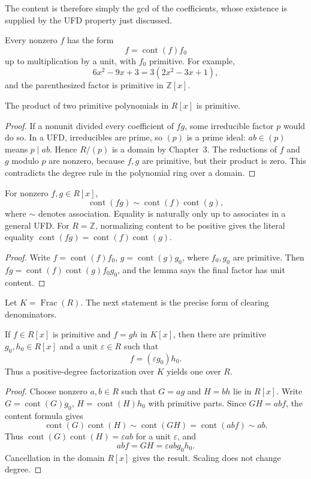 The content is therefore simply the gcd of the coefficients, whose existence
is supplied by the UFD property just discussed.

Every nonzero \(f\) has the form
\[f=\operatorname{cont}(f)f_0\]
up to multiplication by a unit, with \(f_0\) primitive.
For example,
\[6x^2-9x+3=3(2x^2-3x+1),\]
and the parenthesized factor is primitive in \(\mathbb Z[x]\).

\begin{lemma}
The product of two primitive polynomials in \(R[x]\) is primitive.
\end{lemma}
\begin{proof}
If a nonunit divided every coefficient of \(fg\), some irreducible factor
\(p\) would do so.  In a UFD, irreducibles are prime, so \((p)\) is a prime
ideal: \(ab\in(p)\) means \(p\mid ab\).  Hence \(R/(p)\) is a domain by
Chapter~3.  The reductions of \(f\) and \(g\) modulo \(p\) are nonzero,
because \(f,g\) are primitive, but their product is zero.  This contradicts
the degree rule in the polynomial ring over a domain.
\end{proof}

\begin{corollary}
For nonzero \(f,g\in R[x]\),
\[\operatorname{cont}(fg)\sim\operatorname{cont}(f)\operatorname{cont}(g),\]
where \(\sim\) denotes association.  Equality is naturally only up to
associates in a general UFD.  For \(R=\mathbb Z\), normalizing content to
be positive gives the literal equality
\(\operatorname{cont}(fg)=\operatorname{cont}(f)\operatorname{cont}(g)\).
\end{corollary}
\begin{proof}
Write \(f=\operatorname{cont}(f)f_0\),
\(g=\operatorname{cont}(g)g_0\), where \(f_0,g_0\) are primitive.
Then \(fg=\operatorname{cont}(f)\operatorname{cont}(g)f_0g_0\), and the
lemma says the final factor has unit
content.
\end{proof}

Let \(K=\operatorname{Frac}(R)\).  The next statement is the precise form
of clearing denominators.

\begin{lemma}
If \(f\in R[x]\) is primitive and \(f=gh\) in \(K[x]\), then there are
primitive \(g_0,h_0\in R[x]\) and a unit \(\varepsilon\in R\) such that
\[f=(\varepsilon g_0)h_0.\]
Thus a positive-degree factorization over \(K\) yields one over \(R\).
\end{lemma}
\begin{proof}
Choose nonzero \(a,b\in R\) such that \(G=ag\) and \(H=bh\) lie in \(R[x]\).
Write \(G=\operatorname{cont}(G)g_0\),
\(H=\operatorname{cont}(H)h_0\) with primitive parts.  Since
\(GH=abf\), the content formula gives
\[\operatorname{cont}(G)\operatorname{cont}(H)
\sim\operatorname{cont}(GH)=\operatorname{cont}(abf)\sim ab.\]
Thus \(\operatorname{cont}(G)\operatorname{cont}(H)=\varepsilon ab\) for a
unit \(\varepsilon\), and
\[abf=GH=\varepsilon abg_0h_0.\]
Cancellation in the domain \(R[x]\) gives the result.  Scaling does not
change degree.
\end{proof}

